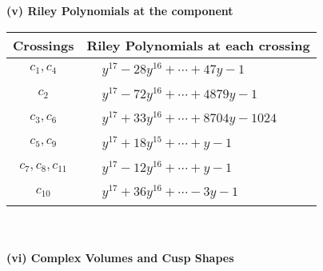 \documentclass[1p]{elsarticle_modified}
\theoremstyle{definition}
\begin{document}
\newpage\renewcommand{\arraystretch}{1}
\flushleft \textbf{(v) Riley Polynomials at the component}\newline \\
\begin{tabular}{m{50pt}|m{274pt}}
Crossings & \hspace{64pt}Riley Polynomials at each crossing \\
\hline $$\begin{aligned}c_{1},c_{4}\end{aligned}$$&$\begin{aligned}
&y^{17}-28 y^{16}+\cdots+47 y-1
\end{aligned}$\\
\hline $$\begin{aligned}c_{2}\end{aligned}$$&$\begin{aligned}
&y^{17}-72 y^{16}+\cdots+4879 y-1
\end{aligned}$\\
\hline $$\begin{aligned}c_{3},c_{6}\end{aligned}$$&$\begin{aligned}
&y^{17}+33 y^{16}+\cdots+8704 y-1024
\end{aligned}$\\
\hline $$\begin{aligned}c_{5},c_{9}\end{aligned}$$&$\begin{aligned}
&y^{17}+18 y^{15}+\cdots+y-1
\end{aligned}$\\
\hline $$\begin{aligned}c_{7},c_{8},c_{11}\end{aligned}$$&$\begin{aligned}
&y^{17}-12 y^{16}+\cdots+y-1
\end{aligned}$\\
\hline $$\begin{aligned}c_{10}\end{aligned}$$&$\begin{aligned}
&y^{17}+36 y^{16}+\cdots-3 y-1
\end{aligned}$\\
\hline
\end{tabular}\\~\\
\newpage\flushleft \textbf{(vi) Complex Volumes and Cusp Shapes}
\end{document}

